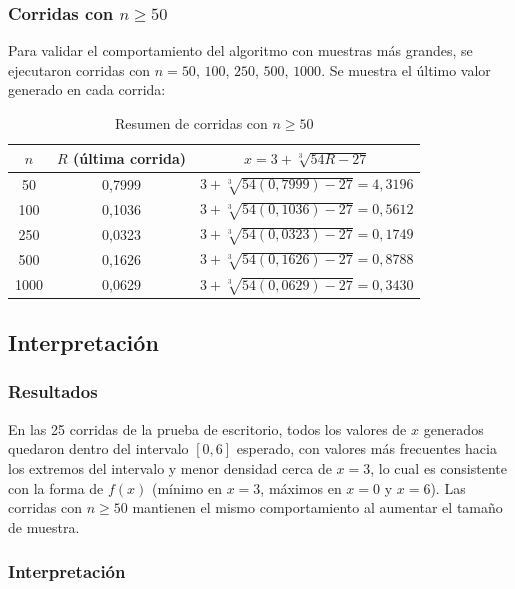 \documentclass[12pt, a4paper]{article}
\newenvironment{mitabla}[2][H]{%
  \begin{table}[#1]
  \centering
  \caption{#2}
  \small
}{%
  \end{table}
}
\begin{document}
\subsubsection{\texorpdfstring{Corridas con $n \geq 50$}{Corridas con n mayor igual 50}}

Para validar el comportamiento del algoritmo con muestras más grandes, se ejecutaron corridas con $n = 50$, $100$, $250$, $500$, $1000$. Se muestra el último valor generado en cada corrida:

\begin{mitabla}{\texorpdfstring{Resumen de corridas con $n \geq 50$}{Resumen de corridas con n mayor igual 50}}
\begin{tabular}{ccc}
\toprule
$n$ & $R$ (última corrida) & $x=3+\sqrt[3]{54R-27}$ \\
\midrule
50 & 0,7999 & $3+\sqrt[3]{54(0,7999)-27} = 4,3196$ \\
100 & 0,1036 & $3+\sqrt[3]{54(0,1036)-27} = 0,5612$ \\
250 & 0,0323 & $3+\sqrt[3]{54(0,0323)-27} = 0,1749$ \\
500 & 0,1626 & $3+\sqrt[3]{54(0,1626)-27} = 0,8788$ \\
1000 & 0,0629 & $3+\sqrt[3]{54(0,0629)-27} = 0,3430$ \\
\bottomrule
\end{tabular}
\end{mitabla}

\subsection{Interpretación}

\subsubsection{Resultados}

En las 25 corridas de la prueba de escritorio, todos los valores de $x$ generados quedaron dentro del intervalo $[0,6]$ esperado, con valores más frecuentes hacia los extremos del intervalo y menor densidad cerca de $x=3$, lo cual es consistente con la forma de $f(x)$ (mínimo en $x=3$, máximos en $x=0$ y $x=6$). Las corridas con $n \geq 50$ mantienen el mismo comportamiento al aumentar el tamaño de muestra.

\subsubsection{Interpretación}
\end{document}
